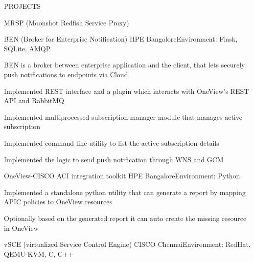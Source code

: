 \documentclass{resume} %
\begin{document}
\begin{rSection}{PROJECTS}
\begin{rSubsection}{MRSP (Moonshot Redfish Service Proxy)}
\end{rSubsection}


\begin{rSubsection}{BEN (Broker for Enterprise Notification)}
{HPE Bangalore}{Environment: Flask, SQLite, AMQP}{ }  %

\vspace{-3pt}

\item BEN is a broker between enterprise application and the client, that lets securely push notifications to endpoints via Cloud
\item Implemented REST interface and a plugin which interacts with OneView's REST API and RabbitMQ
\item Implemented multiprocessed subscription manager module that manages active subscription
\item Implemented command line utility to list the active subscription details
\item Implemented the logic to send push notification through WNS and GCM

\end{rSubsection}


\begin{rSubsection}{OneView-CISCO ACI integration toolkit}
{HPE Bangalore}{Environment: Python}{ }  %

\vspace{-3pt}

\item Implemented a standalone python utility that can generate a report by mapping APIC policies to OneView resources 
\item Optionally based on the generated report it can auto create the missing resource in OneView

\end{rSubsection}


\begin{rSubsection}{vSCE (virtualized Service Control Engine)}
{CISCO Chennai}{Environment: RedHat, QEMU-KVM, C, C++}{ }  %


\end{rSubsection}
\end{rSection}
\end{document}
